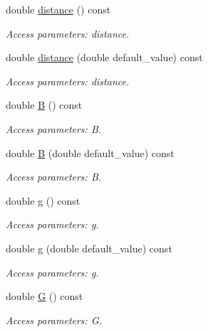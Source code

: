 \begin{DoxyCompactItemize}
double \hyperlink{struct_d_d4hep_1_1_x_m_l_1_1_dimension_a992d80466c835c2896adf1aeedcecda2}{distance} () const 
\begin{DoxyCompactList}\small\item\em Access parameters: distance. \item\end{DoxyCompactList}\item 
double \hyperlink{struct_d_d4hep_1_1_x_m_l_1_1_dimension_a73d16bac34cb0394e793fb86b558fb65}{distance} (double default\_\-value) const 
\begin{DoxyCompactList}\small\item\em Access parameters: distance. \item\end{DoxyCompactList}\item 
double \hyperlink{struct_d_d4hep_1_1_x_m_l_1_1_dimension_a37fade207b62696767d96e141218af65}{B} () const 
\begin{DoxyCompactList}\small\item\em Access parameters: B. \item\end{DoxyCompactList}\item 
double \hyperlink{struct_d_d4hep_1_1_x_m_l_1_1_dimension_aa616ec66dd64445fc150bc74d1c93507}{B} (double default\_\-value) const 
\begin{DoxyCompactList}\small\item\em Access parameters: B. \item\end{DoxyCompactList}\item 
double \hyperlink{struct_d_d4hep_1_1_x_m_l_1_1_dimension_ac985de89779aec40442a5e742b5ddfa0}{g} () const 
\begin{DoxyCompactList}\small\item\em Access parameters: g. \item\end{DoxyCompactList}\item 
double \hyperlink{struct_d_d4hep_1_1_x_m_l_1_1_dimension_a65e4fda444d3e0bff0a49f3e3aabb583}{g} (double default\_\-value) const 
\begin{DoxyCompactList}\small\item\em Access parameters: g. \item\end{DoxyCompactList}\item 
double \hyperlink{struct_d_d4hep_1_1_x_m_l_1_1_dimension_a29115a7ce10d04d3b2be7ec5cf707a04}{G} () const 
\begin{DoxyCompactList}\small\item\em Access parameters: G. \item\end{DoxyCompactList}\item 

\end{DoxyCompactItemize}
